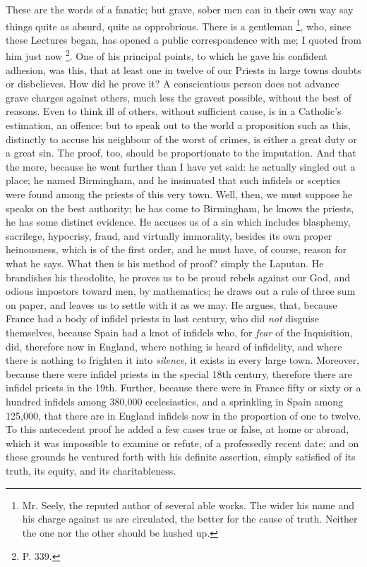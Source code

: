 These are the words of a fanatic; but grave, sober men
can in their own way say things quite as absurd, quite as
opprobrious. There is a gentleman \footnote{Mr. Seely, the reputed author
of several able works. The wider his name and his charge
against us are circulated, the better for the cause of
truth. Neither the one nor the other should be hushed up.}, who, since these Lectures
began, has opened a public correspondence with me; I
quoted from him just now \footnote{P. 339.}. One of his principal points,
to which he gave his confident adhesion, was this, that
at least one in twelve of our Priests in large towns
doubts or disbelieves. How did he prove it? A
conscientious person does not advance grave charges
against others, much less the gravest possible, without
the best of reasons. Even to think ill of others, without
sufficient cause, is in a Catholic's estimation, an
offence: but to speak out to the world a proposition such
as this, distinctly to accuse his neighbour of the worst
of crimes, is either a great duty or a great sin. The
proof, too, should be proportionate to the imputation.
And that the more, because he went further than I have
yet said: he actually singled out a place; he named
Birmingham, and he insinuated that such infidels or
sceptics were found among the priests of this very town.
Well, then, we must suppose he speaks on the best
authority; he has come to Birmingham, he knows the
priests, he has some distinct evidence. He accuses us of
a sin which includes blasphemy, sacrilege, hypocrisy,
fraud, and virtually immorality, besides its own proper
heinousness, which is of the first order, and he must
have, of course, reason for what he says. What then is
his method of proof? simply the Laputan. He brandishes
his theodolite, he proves us to be proud rebels against
our God, and odious impostors toward men, by mathematics;
he draws out a rule of three sum on paper, and leaves us
to settle with it as we may. He argues, that, because
France had a body of infidel priests in last century, who
did \emph{not} disguise themselves, because Spain had a
knot of infidels who, for \emph{fear} of the
Inquisition, did, therefore now in England, where nothing
is heard of infidelity, and where there is nothing to
frighten it into \emph{silence}, it exists in every
large town. Moreover, because there were infidel priests
in the special 18th century, therefore there are infidel
priests in the 19th. Further, because there were in
France fifty or sixty or a hundred infidels among 380,000
ecclesiastics, and a sprinkling in Spain among 125,000,
that there are in England infidels now in the proportion
of one to twelve. To this antecedent proof he added a few
cases true or false, at home or abroad, which it was
impossible to examine or refute, of a professedly recent
date; and on these grounds he ventured forth with his
definite assertion, simply satisfied of its truth, its
equity, and its charitableness.


